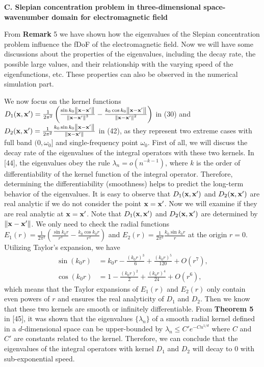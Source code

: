 \documentclass[a4paper,12pt]{article}
\begin{document}
\begin{framed}
   {\bf C. Slepian concentration problem in three-dimensional space-wavenumber domain for electromagnetic field}
   
   \setcounter{equation}{46}
   
   {\color{red}
   
   \quad From {\bf Remark} 5 we have shown how the eigenvalues of the Slepian concentration problem influence the fDoF of the electromagnetic field. Now we will have some discussions about the properties of the eigenvalues, including the decay rate, the possible large values, and their relationship with the varying speed of the eigenfunctions, etc. These properties can also be observed in the numerical simulation part. 
   
   \quad We now focus on the kernel functions $D_1({\bf x},{\bf x}')=\frac{1}{2\pi^2} \left( \frac{\sin k_0\left\| {\bf x}-{\bf x}' \right\|}{\left\| {\bf x}-{\bf x}' \right\|^3}-\frac{k_0\cos k_0\left\| {\bf x}-{\bf x}' \right\|}{\left\| {\bf x}-{\bf x}' \right\|^2} \right)$ in (30) and $D_2({\bf x},{\bf x}') = \frac{1}{2\pi^2} \frac{k_0\sin k_0 \left\| {\bf x}-{\bf x}' \right\|}{\left\|  {\bf x}-{\bf x}' \right\|}$ in (42), as they represent two extreme cases with full band $(0,\omega_0]$ and single-frequency point $\omega_0$. First of all, we will discuss the decay rate of the eigenvalues of the integral operators with these two kernels. In [44], the eigenvalues obey the rule $\lambda_n  = o(n^{-k-1})$, where $k$ is the order of differentiability of the kernel function of the integral operator. Therefore, determining the differentiability (smoothness) helps to predict the long-term behavior of the eigenvalues.
   It is easy to observe that $D_1({\bf x},{\bf x}')$ and $D_2({\bf x},{\bf x}')$ are real analytic if we do not consider the point ${\bf x} = {\bf x}'$. Now we will examine if they are real analytic at ${\bf x} = {\bf x}'$. 
   Note that $D_1({\bf x},{\bf x}')$ and $D_2({\bf x},{\bf x}')$ are determined by $\left\|{\bf x}-{\bf x}'\right\|$. We only need to check the radial functions $E_1(r) = \frac{1}{2\pi^2} \left( \frac{\sin k_0 r}{r^3} - \frac{k_0 \cos k_0 r}{r^2} \right)$ and $E_2(r) = \frac{1}{2 \pi^2} \frac{k_0 \sin k_0 r}{r}$ at the origin $r = 0$. Utilizing Taylor's expansion, we have 
   \begin{equation}\begin{aligned}\sin(k_0r)&=k_0r-\frac{(k_0r)^3}{6}+\frac{(k_0r)^5}{120}+O(r^7),\\\cos(k_0r)&=1-\frac{(k_0r)^2}{2}+\frac{(k_0r)^4}{24}+O(r^6),\end{aligned}\end{equation}
   which means that the Taylor expansions of $E_1(r)$ and $E_2(r)$ only contain even powers of $r$ and ensures the real analyticity of $D_1$ and $D_2$. Then we know that these two kernels are smooth or infinitely differentiable. From {\bf Theorem 5} in [45], it was shown that the eigenvalues $\{\lambda_n\}$ of a smooth radial kernel defined in a $d$-dimensional space can be upper-bounded by $\lambda_n \leqslant C' e^{-C n^{1/d}}$ where $C$ and $C'$ are constants related to the kernel. Therefore, we can conclude that the eigenvalues of the integral operators with kernel $D_1$ and $D_2$ will decay to 0 with sub-exponential speed.   
   
}
\end{framed}
\end{document}
